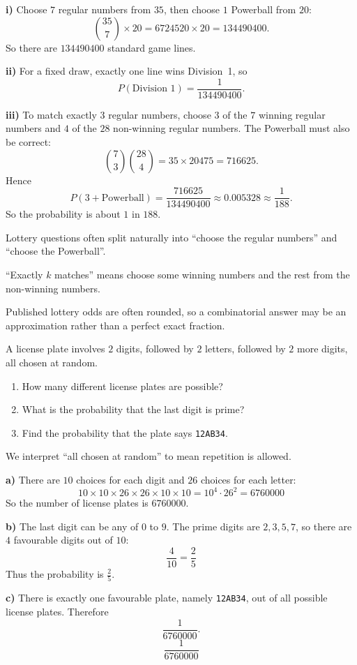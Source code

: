 \begin{solution}
\textbf{i)} Choose $7$ regular numbers from $35$, then choose $1$ Powerball from $20$:
\[
\binom{35}{7}\times 20=6724520\times 20=134490400.
\]
So there are $\boxed{134490400}$ standard game lines.

\textbf{ii)} For a fixed draw, exactly one line wins Division~1, so
\[
P(\text{Division 1})=\frac{1}{134490400}.
\]

\textbf{iii)} To match exactly $3$ regular numbers, choose $3$ of the $7$ winning regular numbers and $4$ of the $28$ non-winning regular numbers. The Powerball must also be correct:
\[
\binom{7}{3}\binom{28}{4}=35\times 20475=716625.
\]
Hence
\[
P(3+\text{Powerball})=\frac{716625}{134490400}\approx 0.005328 \approx \frac{1}{188}.
\]
So the probability is about $\boxed{1 \text{ in } 188}$.
\end{solution}

\begin{takeaways}
\item Lottery questions often split naturally into ``choose the regular numbers'' and ``choose the Powerball''.
\item ``Exactly $k$ matches'' means choose some winning numbers and the rest from the non-winning numbers.
\item Published lottery odds are often rounded, so a combinatorial answer may be an approximation rather than a perfect exact fraction.
\end{takeaways}

\begin{problem}
A license plate involves $2$ digits, followed by $2$ letters, followed by $2$ more digits, all chosen at random.
\begin{enumerate}[label=\alph*)]
\item How many different license plates are possible?
\item What is the probability that the last digit is prime?
\item Find the probability that the plate says \texttt{12AB34}.
\end{enumerate}
\end{problem}

\begin{solution}
We interpret ``all chosen at random'' to mean repetition is allowed.

\textbf{a)} There are $10$ choices for each digit and $26$ choices for each letter:
\[
10 \times 10 \times 26 \times 26 \times 10 \times 10 = 10^4 \cdot 26^2 = 6760000
\]
So the number of license plates is $\boxed{6760000}$.

\textbf{b)} The last digit can be any of $0$ to $9$. The prime digits are $2,3,5,7$, so there are $4$ favourable digits out of $10$:
\[
\frac{4}{10} = \frac{2}{5}
\]
Thus the probability is $\boxed{\frac{2}{5}}$.

\textbf{c)} There is exactly one favourable plate, namely \texttt{12AB34}, out of all possible license plates. Therefore
\[
\frac{1}{6760000}.
\]
\[
\boxed{\frac{1}{6760000}}
\]
\end{solution}

